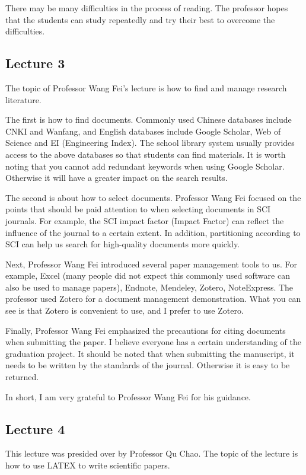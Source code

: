 \documentclass[UTF-8]{ctexart}
\begin{document}
There may be many difficulties in the process of reading. The professor hopes that the students can study repeatedly and try their best to overcome the difficulties.  

\subsection{Lecture 3}
The topic of Professor Wang Fei's lecture is how to find and manage research literature. 

The first is how to find documents. Commonly used Chinese databases include CNKI and Wanfang, and English databases include Google Scholar, Web of Science and EI (Engineering Index). The school library system usually provides access to the above databases so that students can find materials. It is worth noting that you cannot add redundant keywords when using Google Scholar. Otherwise it will have a greater impact on the search results. 

The second is about how to select documents. Professor Wang Fei focused on the points that should be paid attention to when selecting documents in SCI journals. For example, the SCI impact factor (Impact Factor) can reflect the influence of the journal to a certain extent. In addition, partitioning according to SCI can help us search for high-quality documents more quickly. 

Next, Professor Wang Fei introduced several paper management tools to us. For example, Excel (many people did not expect this commonly used software can also be used to manage papers), Endnote, Mendeley, Zotero, NoteExpress. The professor used Zotero for a document management demonstration. What you can see is that Zotero is convenient to use, and I prefer to use Zotero. 

Finally, Professor Wang Fei emphasized the precautions for citing documents when submitting the paper.  I believe everyone has a certain understanding of the graduation project. It should be noted that when submitting the manuscript, it needs to be written by the standards of the journal. Otherwise it is easy to be returned. 

In short, I am very grateful to Professor Wang Fei for his guidance.  

\subsection{Lecture 4} 
This lecture was presided over by Professor Qu Chao. The topic of the lecture is how to use LATEX to write scientific papers.
\end{document}
